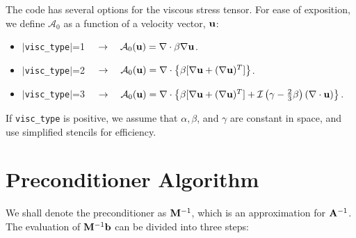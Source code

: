 \documentclass[final]{siamltex}
\def\Ab {{\bf A}}
\def\bb {{\bf b}}
\def\Mb {{\bf M}}
\def\ub {{\bf u}}
\begin{document}
The code has several options for the viscous stress tensor.  For ease of exposition,
we define $\mathcal{A}_0$ as a function of a velocity vector, $\ub$:\\
\begin{itemize}
\item $|${\tt visc\_type}$|$=1 $\quad\rightarrow\quad \mathcal{A}_0(\ub) = \nabla\cdot\beta\nabla\ub$.\\
\item $|${\tt visc\_type}$|$=2 $\quad\rightarrow\quad \mathcal{A}_0(\ub) = \nabla\cdot\left\{\beta[\nabla\ub + (\nabla\ub)^T]\right\}$.\\
\item $|${\tt visc\_type}$|$=3 $\quad\rightarrow\quad \mathcal{A}_0(\ub) = \nabla\cdot\left\{\beta[\nabla\ub + (\nabla\ub)^T] + \mathcal{I}\left(\gamma - \frac{2}{3}\beta\right)(\nabla\cdot\ub)\right\}$.\\
\end{itemize}
If {\tt visc\_type} is positive, we assume that $\alpha, \beta$, and $\gamma$ are constant
in space, and use simplified stencils for efficiency.

\section{Preconditioner Algorithm}

We shall denote the preconditioner as $\Mb^{-1}$, which is an approximation
for $\Ab^{-1}$.  The evaluation of $\Mb^{-1}\bb$ can be divided
into three steps:\\
\end{document}
